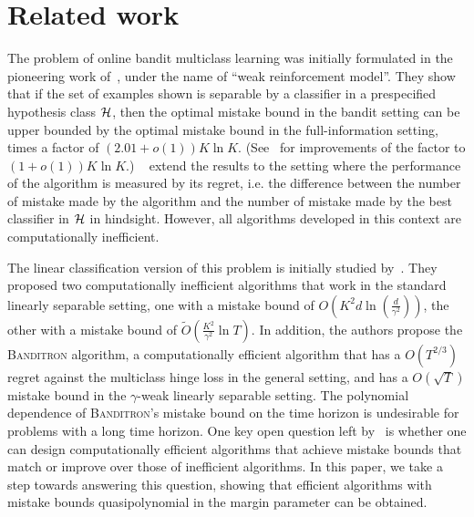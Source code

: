 \section{Related work}
\label{section:related-work}

The problem of online bandit multiclass learning was initially formulated
in the pioneering work of~\cite{Auer-Long-1999}, under the name of
``weak reinforcement model''. They show that if the set of examples shown is
separable by a classifier in a prespecified hypothesis class $\mathcal{H}$, then the optimal
 mistake bound in the bandit setting can be upper bounded by the optimal mistake
 bound in the full-information setting, times a factor of $(2.01 + o(1))K \ln K$.
 (See~\cite{Long-2017} for improvements of the factor to $(1 + o(1)) K \ln K$.)
 ~\cite{Daniely-Helbertal-2013} extend the results to the setting where the
 performance of the algorithm is measured by its regret, i.e. the difference
 between the number of mistake made by the algorithm and the number of mistake
 made by the best classifier in $\mathcal{H}$ in hindsight. However, all algorithms developed in
 this context are computationally inefficient.


The linear classification version of this problem
is initially studied by~\citet{Kakade-Shalev-Shwartz-Tewari-2008}. They proposed
two computationally inefficient algorithms that work in the standard
linearly separable setting, one with a mistake bound of $O(K^2 d
\ln(\frac{d}{\gamma^2}))$, the other with a mistake bound of
$\widetilde{O}(\frac{K^2}{\gamma^2} \ln T)$. In addition, the authors propose
the \textsc{Banditron} algorithm, a computationally efficient algorithm that has
a $O(T^{2/3})$ regret against the multiclass hinge loss in the general setting,
and has a $O(\sqrt{T})$ mistake bound in the $\gamma$-weak linearly separable
setting. The polynomial dependence of \textsc{Banditron}'s mistake bound on the
time horizon is undesirable for problems with a long time horizon. One key open
question left by~\citet{Kakade-Shalev-Shwartz-Tewari-2008} is whether one can
design computationally efficient algorithms that achieve mistake bounds that
match or improve over those of inefficient algorithms. In this paper, we take a
step towards answering this question, showing that efficient algorithms with
mistake bounds quasipolynomial in the margin parameter can be obtained.


